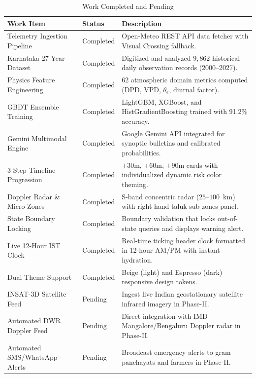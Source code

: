 \documentclass[12pt,a4paper]{report}
\begin{document}
\begin{table}[H]
\centering
\small
\caption{Work Completed and Pending}
\label{tab:work_status}
\vspace{2pt}
\begin{tabularx}{\textwidth}{|L{3.6cm}|L{2.3cm}|Y|}
\hline
\textbf{Work Item} & \textbf{Status} & \textbf{Description} \\ \hline
Telemetry Ingestion Pipeline & Completed & Open-Meteo REST API data fetcher with Visual Crossing fallback. \\ \hline
Karnataka 27-Year Dataset & Completed & Digitized and analyzed $9,862$ historical daily observation records (2000--2027). \\ \hline
Physics Feature Engineering & Completed & 62 atmospheric domain metrics computed (DPD, VPD, $\theta_e$, diurnal factor). \\ \hline
GBDT Ensemble Training & Completed & LightGBM, XGBoost, and HistGradientBoosting trained with 91.2\% accuracy. \\ \hline
Gemini Multimodal Engine & Completed & Google Gemini API integrated for synoptic bulletins and calibrated probabilities. \\ -Step Timeline Progression & Completed & $+30$m, $+60$m, $+90$m cards with individualized dynamic risk color theming. \\ \hline
Doppler Radar \& Micro-Zones & Completed & S-band concentric radar ($25$--$100$~km) with right-hand taluk sub-zones panel. \\ \hline
State Boundary Locking & Completed & Boundary validation that locks out-of-state queries and displays warning alert. \\ \hline
Live 12-Hour IST Clock & Completed & Real-time ticking header clock formatted in 12-hour AM/PM with instant hydration. \\ \hline
Dual Theme Support & Completed & Beige (light) and Espresso (dark) responsive design tokens. \\ \hline
INSAT-3D Satellite Feed & Pending & Ingest live Indian geostationary satellite infrared imagery in Phase-II. \\ \hline
Automated DWR Doppler Feed & Pending & Direct integration with IMD Mangalore/Bengaluru Doppler radar in Phase-II. \\ \hline
Automated SMS/WhatsApp Alerts & Pending & Broadcast emergency alerts to gram panchayats and farmers in Phase-II. \\ \hline
\end{tabularx}
\end{table}
\end{document}
